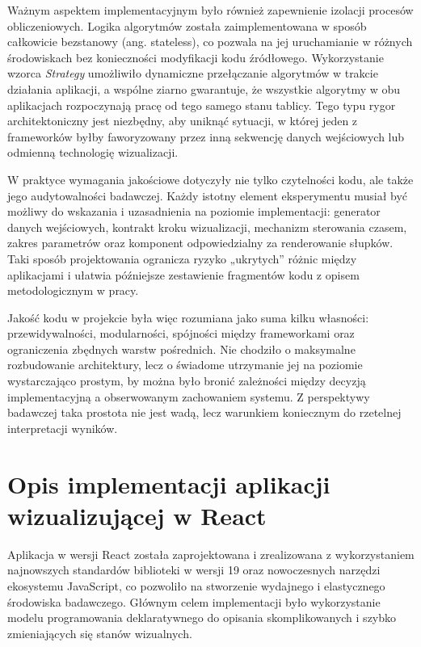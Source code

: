\documentclass[12pt,openright,twoside]{report}
\begin{document}
Ważnym aspektem implementacyjnym było również zapewnienie izolacji procesów obliczeniowych. Logika algorytmów została zaimplementowana w sposób całkowicie bezstanowy (ang. stateless), co pozwala na jej uruchamianie w różnych środowiskach bez konieczności modyfikacji kodu źródłowego. Wykorzystanie wzorca \textit{Strategy} umożliwiło dynamiczne przełączanie algorytmów w trakcie działania aplikacji, a wspólne ziarno gwarantuje, że wszystkie algorytmy w obu aplikacjach rozpoczynają pracę od tego samego stanu tablicy. Tego typu rygor architektoniczny jest niezbędny, aby uniknąć sytuacji, w której jeden z frameworków byłby faworyzowany przez inną sekwencję danych wejściowych lub odmienną technologię wizualizacji.

W praktyce wymagania jakościowe dotyczyły nie tylko czytelności kodu, ale także jego audytowalności badawczej. Każdy istotny element eksperymentu musiał być możliwy do wskazania i uzasadnienia na poziomie implementacji: generator danych wejściowych, kontrakt kroku wizualizacji, mechanizm sterowania czasem, zakres parametrów oraz komponent odpowiedzialny za renderowanie słupków. Taki sposób projektowania ogranicza ryzyko „ukrytych” różnic między aplikacjami i ułatwia późniejsze zestawienie fragmentów kodu z opisem metodologicznym w pracy.

Jakość kodu w projekcie była więc rozumiana jako suma kilku własności: przewidywalności, modularności, spójności między frameworkami oraz ograniczenia zbędnych warstw pośrednich. Nie chodziło o maksymalne rozbudowanie architektury, lecz o świadome utrzymanie jej na poziomie wystarczająco prostym, by można było bronić zależności między decyzją implementacyjną a obserwowanym zachowaniem systemu. Z perspektywy badawczej taka prostota nie jest wadą, lecz warunkiem koniecznym do rzetelnej interpretacji wyników.

\section{Opis implementacji aplikacji wizualizującej w React}
Aplikacja w wersji React została zaprojektowana i zrealizowana z wykorzystaniem najnowszych standardów biblioteki w wersji 19 oraz nowoczesnych narzędzi ekosystemu JavaScript, co pozwoliło na stworzenie wydajnego i elastycznego środowiska badawczego. Głównym celem implementacji było wykorzystanie modelu programowania deklaratywnego do opisania skomplikowanych i szybko zmieniających się stanów wizualnych.
\end{document}
